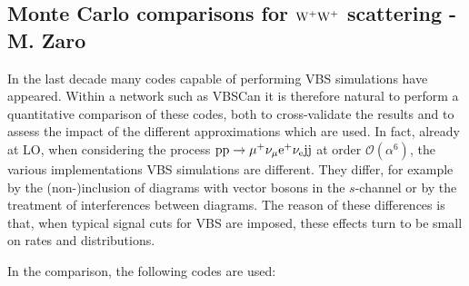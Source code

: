 \subsection{Monte Carlo comparisons for ${\rm W^+ W^+}$ scattering - M. Zaro}
In the last decade many codes capable of performing VBS simulations have appeared.
Within a network such as VBSCan it is therefore natural to perform 
a quantitative comparison of these codes, both to cross-validate the results and to assess the impact of the different approximations which are used.
In fact, already at LO, when considering the process ${\rm p}{\rm p}\to\mu^+\nu_\mu{\rm e}^+\nu_{\rm e}{\rm j}{\rm j}$ at order $\mathcal O (\alpha^6)$, the various implementations VBS simulations are different.
They differ, for example
by the (non-)inclusion of diagrams with vector bosons in the $s$-channel or by the treatment of interferences between diagrams.
The reason of these differences is that, 
when typical signal cuts for VBS are imposed, these effects turn to be small on rates and distributions.

In the comparison, the following codes are used: 

